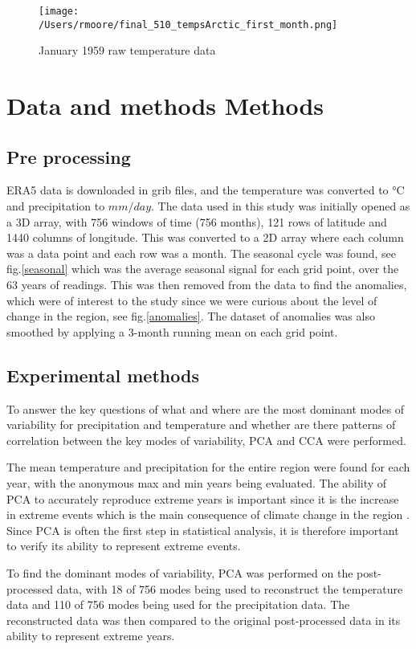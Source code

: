 \documentclass[11pt, oneside]{article}
\begin{document}
\begin{figure}[!htb]
  \centering
    \texttt{[image: /Users/rmoore/final\_510\_tempsArctic\_first\_month.png]}
  \caption{January 1959 raw temperature data}\label{raw}
  \end{figure}




\section{Data and methods Methods}
\subsection{Pre processing}
ERA5 data is downloaded in grib files, and the temperature was converted to °C and precipitation to $mm/day$. The data used in this study was initially opened as a 3D array, with 756 windows of time (756 months), 121 rows of latitude and 1440 columns of longitude. This was converted to a 2D array where each column was a data point and each row was a month. The seasonal cycle was found, see fig.\ref{seasonal} which was the average seasonal signal for each grid point, over the 63 years of readings. This was then removed from the data to find the anomalies, which were of interest to the study since we were curious about the level of change in the region, see fig.\ref{anomalies}. The dataset of anomalies was also smoothed by applying a 3-month running mean on each grid point.
 
\subsection{Experimental methods}
To answer the key questions of what and where are the most dominant modes of variability for precipitation and temperature and whether are there patterns of correlation between the key modes of variability, PCA and CCA were performed.
 
The mean temperature and precipitation for the entire region were found for each year, with the anonymous max and min years being evaluated. The ability of PCA to accurately reproduce extreme years is important since it is the increase in extreme events which is the main consequence of climate change in the region \cite{landrum2020extremes}. Since PCA is often the first step in statistical analysis, it is therefore important to verify its ability to represent extreme events.
 
To find the dominant modes of variability, PCA was performed on the post-processed data, with 18 of 756  modes being used to reconstruct the temperature data and 110 of 756 modes being used for the precipitation data. The reconstructed data was then compared to the original post-processed data in its ability to represent extreme years.
 
\end{document}
